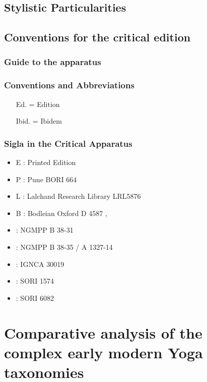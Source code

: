 \section{Stylistic Particularities}

\section{Conventions for the critical edition}

\subsection{Guide to the apparatus}

\subsection{Conventions and Abbreviations}
\begin{itemize}
\item[Ed.] = Edition
\item[Ibid.] = Ibidem
\end{itemize}

\subsection{Sigla in the Critical Apparatus}

\begin{itemize}
\item E : Printed Edition
\item P : Pune BORI 664
\item L : Lalchand Research Library LRL5876
\item B : Bodleian Oxford D 4587
‚\item \None : NGMPP B 38-31
\item \Ntwo : NGMPP B 38-35 / A 1327-14
\item \Done : IGNCA 30019
\item \Uone : SORI 1574
\item \Utwo : SORI 6082
\end{itemize}



\chapter{Comparative analysis of the complex early modern Yoga taxonomies}
\label{yogas_list}
\label{yogatax}
\clearpage


